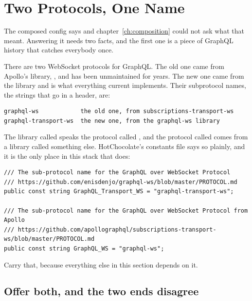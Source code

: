 \section{Two Protocols, One Name}
\label{sec:ch14-two-protocols-one-name}
%

The composed config says  and
chapter~\ref{ch:composition} could not ask what that meant. Answering it needs
two facts, and the first one is a piece of GraphQL history that catches
everybody once.

%
There are two WebSocket protocols for GraphQL. The old one came from Apollo's
library, , and has been unmaintained for
years. The new one came from the  library and is what
everything current implements. Their subprotocol names, the strings that go in
a  header, are:

\begin{verbatim}
graphql-ws            the old one, from subscriptions-transport-ws
graphql-transport-ws  the new one, from the graphql-ws library
\end{verbatim}

The library called  speaks the protocol called
, and the protocol called  comes
from a library called something else. HotChocolate's constants file says so
plainly, and it is the only place in this stack that does:

\begin{verbatim}
/// The sub-protocol name for the GraphQL over WebSocket Protocol
/// https://github.com/enisdenjo/graphql-ws/blob/master/PROTOCOL.md
public const string GraphQL_Transport_WS = "graphql-transport-ws";

/// The sub-protocol name for the GraphQL over WebSocket Protocol from Apollo
/// https://github.com/apollographql/subscriptions-transport-ws/blob/master/PROTOCOL.md
public const string GraphQL_WS = "graphql-ws";
\end{verbatim}

Carry that, because everything else in this section depends on it.

\subsection*{Offer both, and the two ends disagree}


